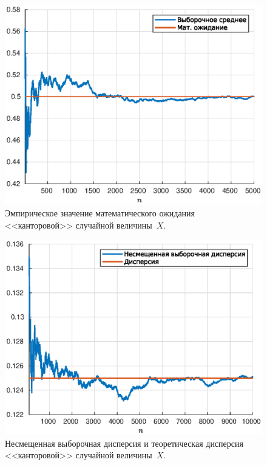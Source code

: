 \begin{figure}[b]
        \includegraphics[width=\linewidth]{task_02/expectes10-5000.eps}
        \caption{Эмпирическое значение математического ожидания <<канторовой>> случайной величины~$X$.}
\end{figure}
\begin{figure}[t]
        \includegraphics[width=\linewidth]{task_02/var100-10000.eps}
        \caption{Несмещенная выборочная дисперсия и теоретическая дисперсия <<канторовой>> случайной величины~$X$.}
\end{figure}

